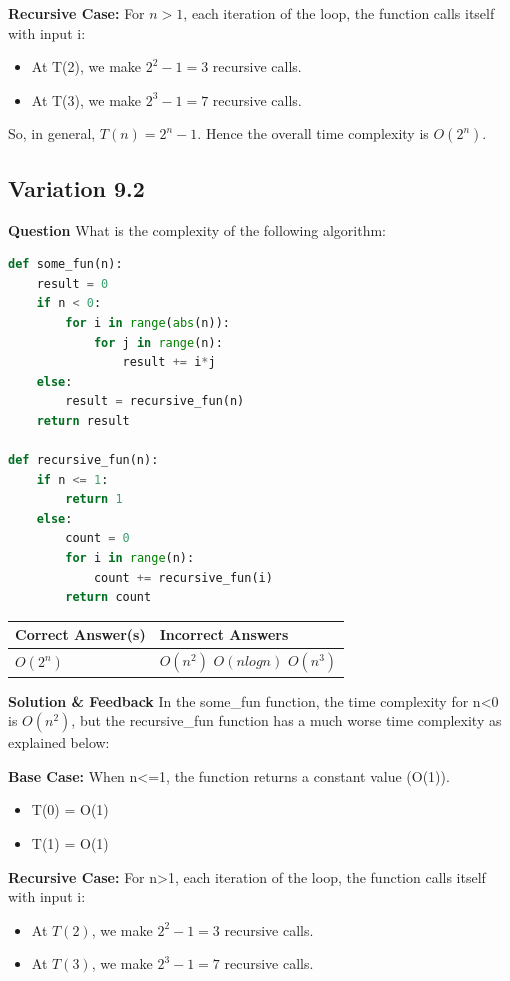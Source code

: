 \textbf{Recursive Case:} For $n>1$, each iteration of the loop, the function calls itself with input i:
\begin{itemize}
\item At T(2), we make $2^2-1=3$ recursive calls.
\item At T(3), we make $2^3-1=7$ recursive calls.
\end{itemize}

So, in general, $T(n)=2^n-1$. Hence the overall time complexity is $O(2^n)$.

\subsection{Variation 9.2}
\textbf{Question}
What is the complexity of the following algorithm:

\begin{lstlisting}[language=Python]
def some_fun(n):
    result = 0
    if n < 0:
        for i in range(abs(n)):
            for j in range(n):
                result += i*j
    else:
        result = recursive_fun(n)
    return result

def recursive_fun(n):
    if n <= 1:
        return 1
    else:
        count = 0
        for i in range(n):
            count += recursive_fun(i)
        return count
\end{lstlisting}

\begin{center}
\begin{tabular}{|l|l|}
\hline
\textbf{Correct Answer(s)} & \textbf{Incorrect Answers} \\
\hline
$O(2^n)$ & $O(n^2)$ $O(nlogn)$ $O(n^3)$ \\
\hline
\end{tabular}
\end{center}

\textbf{Solution \& Feedback}
In the some\_fun function, the time complexity for n<0 is $O(n^2)$, but the recursive\_fun function has a much worse time complexity as explained below:

\textbf{Base Case:} When n<=1, the function returns a constant value (O(1)).
\begin{itemize}
\item T(0) = O(1)
\item T(1) = O(1)
\end{itemize}

\textbf{Recursive Case:} For n>1, each iteration of the loop, the function calls itself with input i:
\begin{itemize}
\item At $T(2)$, we make $2^2-1=3$ recursive calls.
\item At $T(3)$, we make $2^3-1=7$ recursive calls.
\end{itemize}

